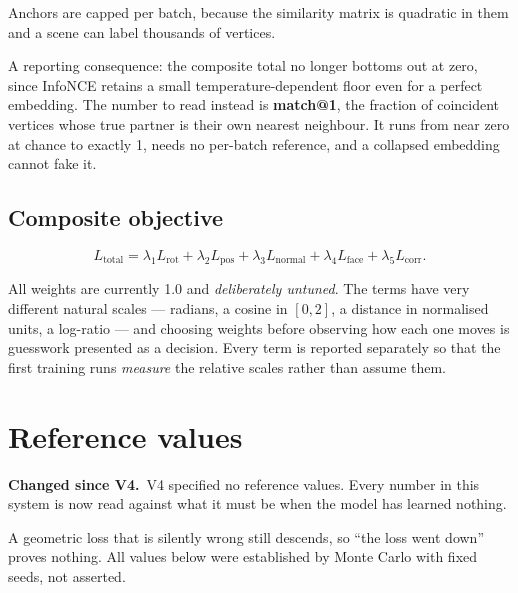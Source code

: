 \documentclass[11pt,a4paper]{report}
\newcommand{\change}[1]{\par\vspace{2pt}\noindent\textcolor{soft}{\small\textbf{Changed since V4.}\ #1}\par\vspace{2pt}}
\begin{document}
Anchors are capped per batch, because the similarity matrix is quadratic in them
and a scene can label thousands of vertices.

A reporting consequence: the composite total no longer bottoms out at zero,
since InfoNCE retains a small temperature-dependent floor even for a perfect
embedding. The number to read instead is \textbf{match@1}, the fraction of
coincident vertices whose true partner is their own nearest neighbour. It runs
from near zero at chance to exactly 1, needs no per-batch reference, and a
collapsed embedding cannot fake it.

\subsection{Composite objective}
\label{sub:composite}

\[
L_{\text{total}} = \lambda_1 L_{\text{rot}} + \lambda_2 L_{\text{pos}}
+ \lambda_3 L_{\text{normal}} + \lambda_4 L_{\text{face}}
+ \lambda_5 L_{\text{corr}} .
\]

All weights are currently 1.0 and \emph{deliberately untuned}. The terms have
very different natural scales --- radians, a cosine in $[0,2]$, a distance in
normalised units, a log-ratio --- and choosing weights before observing how each
one moves is guesswork presented as a decision. Every term is reported
separately so that the first training runs \emph{measure} the relative scales
rather than assume them.

\section{Reference values}
\label{sec:reference}

\change{V4 specified no reference values. Every number in this system is now
read against what it must be when the model has learned nothing.}

A geometric loss that is silently wrong still descends, so ``the loss went
down'' proves nothing. All values below were established by Monte Carlo with
fixed seeds, not asserted.
\end{document}
